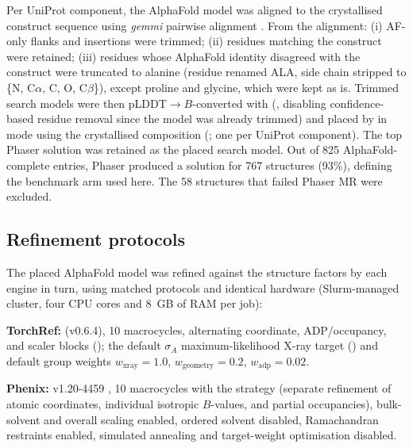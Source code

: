 \documentclass{iucrjournals}
\begin{document}
Per UniProt component, the AlphaFold model was aligned to the crystallised
construct sequence using \emph{gemmi} pairwise alignment
\cite{wojdyr_gemmi_2022}.
From the alignment: (i) AF-only flanks and insertions were trimmed;
(ii) residues matching the construct were retained;
(iii) residues whose AlphaFold identity disagreed with the construct were
truncated to alanine (residue renamed ALA, side chain stripped to
\{N, C$\alpha$, C, O, C$\beta$\}), except proline and glycine, which were
kept as is.
Trimmed search models were then pLDDT$\rightarrow B$-converted with
 (, disabling
confidence-based residue removal since the model was already trimmed) and
placed by  in  mode using the crystallised
composition (; one
 per UniProt component).
The top Phaser solution was retained as the placed search model.
Out of \num{825} AlphaFold-complete entries, Phaser produced a solution for \num{767}
structures (\num{93}\%), defining the benchmark arm used here.
The \num{58} structures that failed Phaser MR were excluded.

\subsection{Refinement protocols}

The placed AlphaFold model was refined against the structure factors by each
engine in turn, using matched protocols and identical hardware (Slurm-managed
cluster, four CPU cores and 8~GB of RAM per job):

\textbf{TorchRef:}  (v0.6.4), 10 macrocycles, alternating
coordinate, ADP/occupancy, and scaler blocks (); the
default $\sigma_{A}$ maximum-likelihood X-ray target ()
and default group weights $w_\mathrm{xray}=1.0$, $w_\mathrm{geometry}=0.2$,
$w_\mathrm{adp}=0.02$.

\textbf{Phenix:}  v1.20-4459 \cite{liebschner_macromolecular_2019},
10 macrocycles with the 
strategy (separate refinement of atomic coordinates, individual isotropic
$B$-values, and partial occupancies), bulk-solvent and overall scaling enabled,
ordered solvent disabled, Ramachandran restraints enabled, simulated annealing
and target-weight optimisation disabled.
\end{document}
